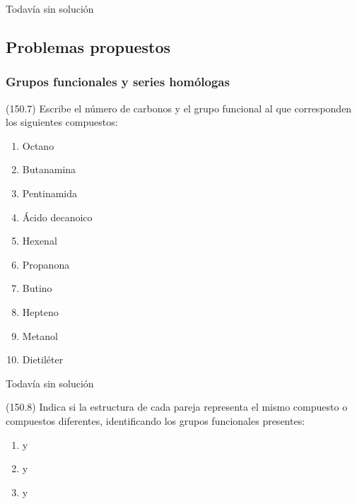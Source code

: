   \begin{solution}[print=false]
    Todavía sin solución
  \end{solution}






  \subsection*{Problemas propuestos}

  \subsubsection*{Grupos funcionales y series homólogas}

  \begin{exercise}[
      tags    = {},
      topics  = {química, química orgánica, orgánica},
      source  = {FQ 1B MGH 2016, p150, e7},
    ]
    (150.7) Escribe el número de carbonos y el grupo funcional al que
    corresponden los siguientes compuestos:
    \begin{enumerate}
      \item Octano
      \item Butanamina
      \item Pentinamida
      \item Ácido decanoico
      \item Hexenal
      \item Propanona
      \item Butino
      \item Hepteno
      \item Metanol
      \item Dietiléter
    \end{enumerate}
  \end{exercise}

  \begin{solution}[print=false]
    Todavía sin solución
  \end{solution}




  \begin{exercise}[
      tags    = {},
      topics  = {química, química orgánica, orgánica},
      source  = {FQ 1B MGH 2016, p150, e8},
    ]
    (150.8) Indica si la estructura de cada pareja representa el mismo
    compuesto o compuestos diferentes, identificando los grupos
    funcionales presentes:
    \begin{enumerate}
      \item {} y 
      \item {} y 
      \item {} y 
    \end{enumerate}
  \end{exercise}

